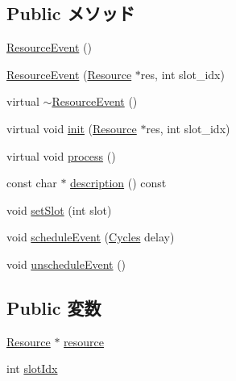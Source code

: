 \subsection*{Public メソッド}
\begin{DoxyCompactItemize}
\item 
\hyperlink{classResourceEvent_a587b69e246a088ece211c6945b11ecd4}{ResourceEvent} ()
\item 
\hyperlink{classResourceEvent_a8fa1f116a7d1e348370d76d05e0616ea}{ResourceEvent} (\hyperlink{classResource}{Resource} $\ast$res, int slot\_\-idx)
\item 
virtual \hyperlink{classResourceEvent_afc726427e1e30058d481924bf372e245}{$\sim$ResourceEvent} ()
\item 
virtual void \hyperlink{classResourceEvent_ac5f8be30d21fb73f191f9e7319c55bb4}{init} (\hyperlink{classResource}{Resource} $\ast$res, int slot\_\-idx)
\item 
virtual void \hyperlink{classResourceEvent_a2e9c5136d19b1a95fc427e0852deab5c}{process} ()
\item 
const char $\ast$ \hyperlink{classResourceEvent_a5a14fe478e2393ff51f02e9b7be27e00}{description} () const 
\item 
void \hyperlink{classResourceEvent_ad48b0bd4f7e8bd7723ea364a02f69f1f}{setSlot} (int slot)
\item 
void \hyperlink{classResourceEvent_af53dcbdc9da1cc615d43ff3bd2b4162c}{scheduleEvent} (\hyperlink{classCycles}{Cycles} delay)
\item 
void \hyperlink{classResourceEvent_a8521a64adc8d310754330bc7dfe48831}{unscheduleEvent} ()
\end{DoxyCompactItemize}
\subsection*{Public 変数}
\begin{DoxyCompactItemize}
\item 
\hyperlink{classResource}{Resource} $\ast$ \hyperlink{classResourceEvent_aff139c0e9f09dded86c2ed5be8e0bace}{resource}
\item 
int \hyperlink{classResourceEvent_a5a79aee1f5a2cb398bf8b968dbc90cd9}{slotIdx}
\end{DoxyCompactItemize}


